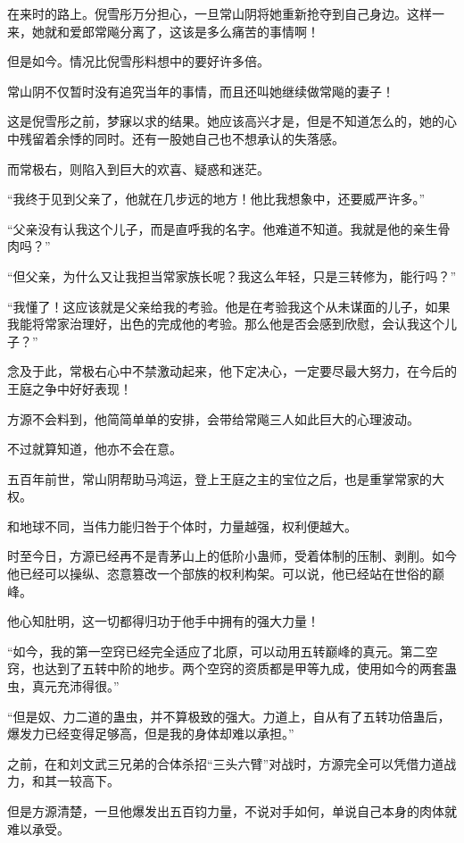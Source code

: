 \begin{this_body}
在来时的路上。倪雪彤万分担心，一旦常山阴将她重新抢夺到自己身边。这样一来，她就和爱郎常飚分离了，这该是多么痛苦的事情啊！

但是如今。情况比倪雪彤料想中的要好许多倍。

常山阴不仅暂时没有追究当年的事情，而且还叫她继续做常飚的妻子！

这是倪雪彤之前，梦寐以求的结果。她应该高兴才是，但是不知道怎么的，她的心中残留着余悸的同时。还有一股她自己也不想承认的失落感。

而常极右，则陷入到巨大的欢喜、疑惑和迷茫。

“我终于见到父亲了，他就在几步远的地方！他比我想象中，还要威严许多。”

“父亲没有认我这个儿子，而是直呼我的名字。他难道不知道。我就是他的亲生骨肉吗？”

“但父亲，为什么又让我担当常家族长呢？我这么年轻，只是三转修为，能行吗？”

“我懂了！这应该就是父亲给我的考验。他是在考验我这个从未谋面的儿子，如果我能将常家治理好，出色的完成他的考验。那么他是否会感到欣慰，会认我这个儿子？”

念及于此，常极右心中不禁激动起来，他下定决心，一定要尽最大努力，在今后的王庭之争中好好表现！

方源不会料到，他简简单单的安排，会带给常飚三人如此巨大的心理波动。

不过就算知道，他亦不会在意。

五百年前世，常山阴帮助马鸿运，登上王庭之主的宝位之后，也是重掌常家的大权。

和地球不同，当伟力能归咎于个体时，力量越强，权利便越大。

时至今日，方源已经再不是青茅山上的低阶小蛊师，受着体制的压制、剥削。如今他已经可以操纵、恣意篡改一个部族的权利构架。可以说，他已经站在世俗的巅峰。

他心知肚明，这一切都得归功于他手中拥有的强大力量！

“如今，我的第一空窍已经完全适应了北原，可以动用五转巅峰的真元。第二空窍，也达到了五转中阶的地步。两个空窍的资质都是甲等九成，使用如今的两套蛊虫，真元充沛得很。”

“但是奴、力二道的蛊虫，并不算极致的强大。力道上，自从有了五转功倍蛊后，爆发力已经变得足够高，但是我的身体却难以承担。”

之前，在和刘文武三兄弟的合体杀招“三头六臂”对战时，方源完全可以凭借力道战力，和其一较高下。

但是方源清楚，一旦他爆发出五百钧力量，不说对手如何，单说自己本身的肉体就难以承受。


\end{this_body}
